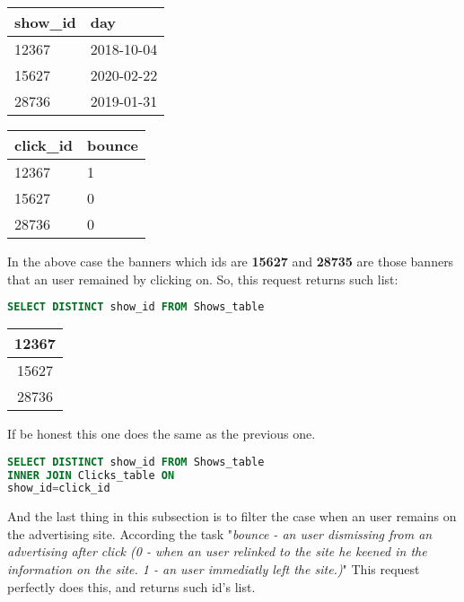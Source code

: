 \documentclass[14pt, a4paper]{extarticle}
\begin{document}
\begin{enumerate}
\begin{minipage}{.3\linewidth}
    \begin{tabular}{|l|l|}
        \hline
        show\_id & day        \\ \hline
        \cellcolor[HTML]{3FBFB8} 12367    & 2018-10-04 \\ \hline
        \cellcolor[HTML]{BF3F41} 15627    & 2020-02-22 \\ \hline
        \cellcolor[HTML]{D9DD1C} 28736    & 2019-01-31 \\ \hline
    \end{tabular}
\end{minipage}
\begin{minipage}{.3\linewidth}
    \begin{tabular}{|l|l|}
        \hline
        click\_id & bounce	\\ \hline
        \cellcolor[HTML]{3FBFB8} 12367 	   & \cellcolor[HTML]{D60E0E} 1       \\ \hline
        \cellcolor[HTML]{BF3F41} 15627 	   & \cellcolor[HTML]{4CDD1C} 0       \\ \hline
        \cellcolor[HTML]{D9DD1C} 28736     & \cellcolor[HTML]{4CDD1C} 0		\\ \hline	
    \end{tabular}
\end{minipage}

In the above case the banners which ids are \textbf{15627} and \textbf{28735}
are those banners that an user remained by clicking on.
So, this request returns such list:

\begin{lstlisting}[language=SQL]
SELECT DISTINCT show_id FROM Shows_table 
\end{lstlisting}


\begin{tabular}{|c|}
    \hline
    12367 \\ \hline
    15627 \\ \hline
    28736 \\ \hline
\end{tabular}

If be honest this one does the same as the previous one.

\begin{lstlisting}[language=SQL]
SELECT DISTINCT show_id FROM Shows_table 
INNER JOIN Clicks_table ON
show_id=click_id
\end{lstlisting}

And the last thing in this subsection is to filter the case when an user remains
on the advertising site. According the task "\emph{bounce - an user dismissing from an advertising after click (0 - when an user relinked to the site 
he keened in the information on the site. 1 - an user immediatly left the site.)}"
This request perfectly does this, and returns such id's list.


\end{enumerate}
\end{document}
